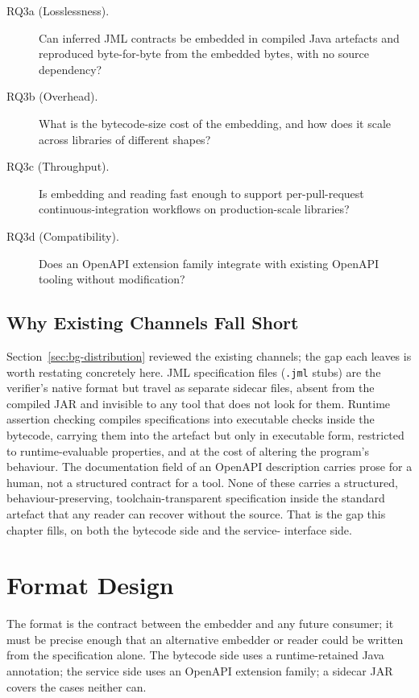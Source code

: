 \begin{description}
  \item[RQ3a (Losslessness).] Can inferred JML contracts be embedded in
        compiled Java artefacts and reproduced byte-for-byte from the embedded
        bytes, with no source dependency?
  \item[RQ3b (Overhead).] What is the bytecode-size cost of the embedding, and
        how does it scale across libraries of different shapes?
  \item[RQ3c (Throughput).] Is embedding and reading fast enough to support
        per-pull-request continuous-integration workflows on production-scale
        libraries?
  \item[RQ3d (Compatibility).] Does an OpenAPI extension family integrate with
        existing OpenAPI tooling without modification?
\end{description}

\subsection{Why Existing Channels Fall Short}

Section~\ref{sec:bg-distribution} reviewed the existing channels; the gap each
leaves is worth restating concretely here. JML specification files (\texttt{.jml}
stubs) are the verifier's native format but travel as separate sidecar files,
absent from the compiled JAR and invisible to any tool that does not look for
them. Runtime assertion checking compiles specifications into executable checks
inside the bytecode, carrying them into the artefact but only in executable
form, restricted to runtime-evaluable properties, and at the cost of altering
the program's behaviour. The documentation field of an OpenAPI description
carries prose for a human, not a structured contract for a tool. None of these
carries a structured, behaviour-preserving, toolchain-transparent specification
inside the standard artefact that any reader can recover without the source.
That is the gap this chapter fills, on both the bytecode side and the service-
interface side.

\section{Format Design}
\label{sec:dist-format}

The format is the contract between the embedder and any future consumer; it
must be precise enough that an alternative embedder or reader could be written
from the specification alone. The bytecode side uses a runtime-retained Java
annotation; the service side uses an OpenAPI extension family; a sidecar JAR
covers the cases neither can.


